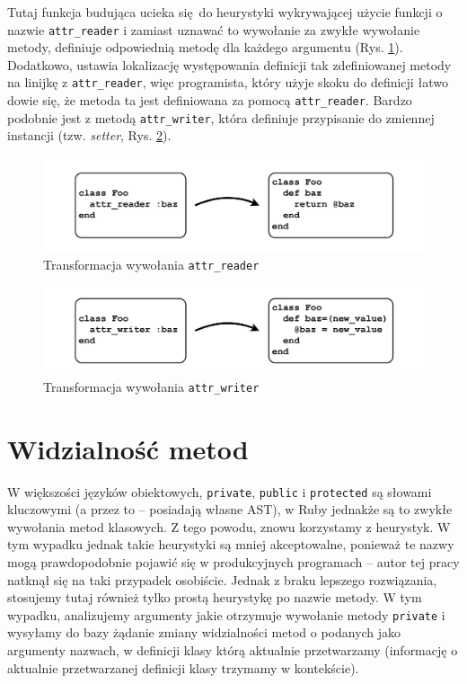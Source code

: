 \documentclass[declaration,shortabstract,mgr]{iithesis}
\begin{document}
Tutaj funkcja budująca ucieka się do heurystyki wykrywającej użycie funkcji o nazwie \texttt{attr\_reader} i zamiast uznawać to wywołanie za zwykłe wywołanie metody, definiuje odpowiednią metodę dla każdego argumentu (Rys. \ref{fig:attr-reader}). Dodatkowo, ustawia lokalizację występowania definicji tak zdefiniowanej metody na linijkę z \texttt{attr\_reader}, więc programista, który użyje skoku do definicji łatwo dowie się, że metoda ta jest definiowana za pomocą \texttt{attr\_reader}. Bardzo podobnie jest z metodą \texttt{attr\_writer}, która definiuje przypisanie do zmiennej instancji (tzw. \textit{setter}, Rys. \ref{fig:attr-writer}).

\begin{figure}[htb]
	\centering
	\includegraphics[scale=0.6]{imgs/attr-reader.png}
	\caption{Transformacja wywołania \texttt{attr\_reader}}
	\label{fig:attr-reader}
\end{figure}

\begin{figure}[htb]
	\centering
	\includegraphics[scale=0.6]{imgs/attr-writer.png}
	\caption{Transformacja wywołania \texttt{attr\_writer}}
	\label{fig:attr-writer}
\end{figure}

\section{Widzialność metod}

W większości języków obiektowych, \texttt{private}, \texttt{public} i \texttt{protected} są słowami kluczowymi (a przez to -- posiadają własne AST), w Ruby jednakże są to zwykłe wywołania metod klasowych. Z tego powodu, znowu korzystamy z heurystyk. W tym wypadku jednak takie heurystyki są mniej akceptowalne, ponieważ te nazwy mogą prawdopodobnie pojawić się w produkcyjnych programach -- autor tej pracy natknął się na taki przypadek osobiście. Jednak z braku lepszego rozwiązania, stosujemy tutaj również tylko prostą heurystykę po nazwie metody. W tym wypadku, analizujemy argumenty jakie otrzymuje wywołanie metody \texttt{private} i wysyłamy do bazy żądanie zmiany widzialności metod o podanych jako argumenty nazwach, w definicji klasy którą aktualnie przetwarzamy (informację o aktualnie przetwarzanej definicji klasy trzymamy w kontekście).
\end{document}

